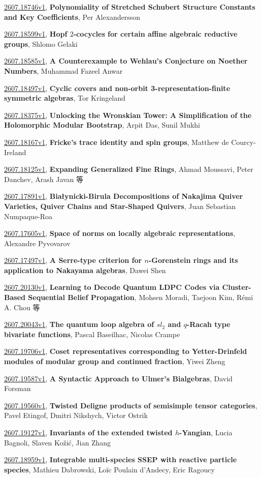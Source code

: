 \documentclass[9pt, a4paper]{article}
\theoremstyle{plain}
\theoremstyle{definition}
\theoremstyle{remark}
\newcommand{\arxiv}[3]{\href{https://arxiv.org/abs/#1}{#1}, \textbf{\textcolor{arxivblue}{#2}}, #3}
\begin{document}
\arxiv{2607.18746v1}{Polynomiality of Stretched Schubert Structure Constants and Key Coefficients}{Per Alexandersson}

\arxiv{2607.18599v1}{Hopf $2$-cocycles for certain affine algebraic reductive groups}{Shlomo Gelaki}

\arxiv{2607.18585v1}{A Counterexample to Wehlau's Conjecture on Noether Numbers}{Muhammad Fazeel Anwar}

\arxiv{2607.18497v1}{Cyclic covers and non-orbit 3-representation-finite symmetric algebras}{Tor Kringeland}

\arxiv{2607.18375v1}{Unlocking the Wronskian Tower: A Simplification of the Holomorphic Modular Bootstrap}{Arpit Das, Sunil Mukhi}

\arxiv{2607.18167v1}{Fricke's trace identity and spin groups}{Matthew de Courcy-Ireland}

\arxiv{2607.18125v1}{Expanding Generalized Fine Rings}{Ahmad Moussavi, Peter Danchev, Arash Javan 等}

\arxiv{2607.17891v1}{Białynicki-Birula Decompositions of Nakajima Quiver Varieties, Quiver Chains and Star-Shaped Quivers}{Juan Sebastian Numpaque-Roa}

\arxiv{2607.17605v1}{Space of norms on locally algebraic representations}{Alexandre Pyvovarov}

\arxiv{2607.17497v1}{A Serre-type criterion for $n$-Gorenstein rings and its application to Nakayama algebras}{Dawei Shen}

\arxiv{2607.20130v1}{Learning to Decode Quantum LDPC Codes via Cluster-Based Sequential Belief Propagation}{Mohsen Moradi, Taejoon Kim, Rémi A. Chou 等}

\arxiv{2607.20043v1}{The quantum loop algebra of $sl_2$ and $q$-Racah type bivariate functions}{Pascal Baseilhac, Nicolas Crampe}

\arxiv{2607.19706v1}{Coset representatives corresponding to Yetter-Drinfeld modules of modular group and continued fraction}{Yiwei Zheng}

\arxiv{2607.19587v1}{A Syntactic Approach to Ulmer's Bialgebras}{David Forsman}

\arxiv{2607.19560v1}{Twisted Deligne products of semisimple tensor categories}{Pavel Etingof, Dmitri Nikshych, Victor Ostrik}

\arxiv{2607.19127v1}{Invariants of the extended twisted $h$-Yangian}{Lucia Bagnoli, Slaven Kožić, Jian Zhang}

\arxiv{2607.18959v1}{Integrable multi-species SSEP with reactive particle species}{Mathieu Dabrowski, Loïc Poulain d'Andecy, Eric Ragoucy}
\end{document}
